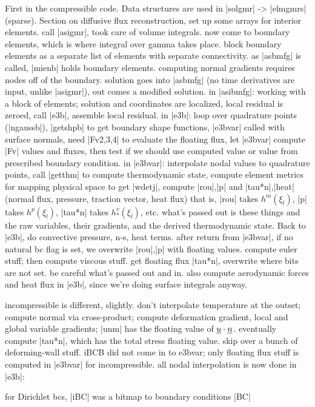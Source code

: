 \documentclass[11pt]{article}
\begin{document}
First in the compressible code.
Data structures are used in |solgmr| -> |elmgmrs| (sparse). Section on diffusive flux reconstruction, set up some arrays for interior elements. call |asigmr|, took care of volume integrals. now come to boundary elements, which is where integral over gamma takes place. block boundary elements as a separate list of elements with separate connectivity. as |asbmfg| is called, |mienb| holds boundary elements. computing normal gradients requires nodes off of the boundary. solution goes into |asbmfg| (no time derivatives are input, unlike |asigmr|), out comes a modified solution. in |asibmfg|: working with a block of elements; solution and coordinates are localized, local residual is zeroed, call |e3b|, assemble local residual. in |e3b|: loop over quadrature points (|ngaussb|), |getshpb| to get boundary shape functions, |e3bvar| called with surface normals, need |Fv{2,3,4}| to evaluate the floating flux, let |e3bvar| compute |Fv| values and fluxes, then test if we should use computed value or value from prescribed boundary condition. in |e3bvar|: interpolate nodal values to quadrature points, call |getthm| to compute thermodynamic state, compute element metrics for mapping physical space to get |wdetj|, compute |rou|,|p| and |tau*n|,|heat| (normal flux, pressure, traction vector, heat flux) that is, |rou| takes $h^m(\xi_l)$, |p| takes $h^p(\xi_l)$, |tau*n| takes $h^v_*(\xi_l)$, etc. what's passed out is these things and the raw variables, their gradients, and the derived thermodynamic state. Back to |e3b|, do convective pressure, n-s, heat terms. after return from |e3bvar|, if no natural bc flag is set, we overwrite |rou|,|p| with floating values. compute euler stuff; then compute viscous stuff. get floating flux |tau*n|, overwrite where bits are not set. be careful what's passed out and in. also compute aerodynamic forces and heat flux in |e3b|, since we're doing surface integrals anyway.

incompressible is different, slightly. don't interpolate temperature at the outset; compute normal via cross-product; compute deformation gradient, local and global variable gradients; |unm| has the floating value of $\underline{u} \cdot \underline{n}$. eventually compute |tau*n|, which has the total stress floating value. skip over a bunch of deforming-wall stuff. iBCB did not come in to e3bvar; only floating flux stuff is computed in |e3bvar| for incompressible. all nodal interpolation is now done in |e3b|:

for Dirichlet bcs, |iBC| was a bitmap to boundary conditions |BC|
\end{document}
